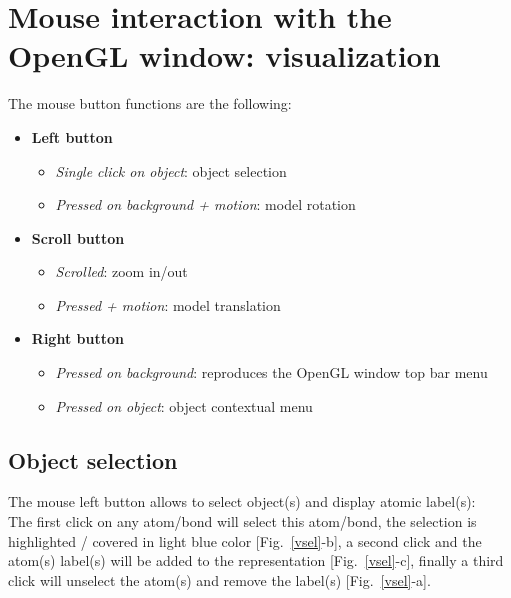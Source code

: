 \clearpage

\section{Mouse interaction with the OpenGL window: visualization}
\label{mviz}

The mouse button functions are the following:
\begin{itemize}
\item {\bf{Left button}}
\begin{itemize}
\item {\em{Single click on object}}: object selection
\item {\em{Pressed on background + motion}}: model rotation 
\end{itemize}
\item {\bf{Scroll button}}
\begin{itemize}
\item {\em{Scrolled}}: zoom in/out
\item {\em{Pressed + motion}}: model translation 
\end{itemize}
\item {\bf{Right button}}
\begin{itemize}
\item {\em{Pressed on background}}: reproduces the OpenGL window top bar menu
\item {\em{Pressed on object}}: object contextual menu
\end{itemize}
\end{itemize}

\subsection{Object selection}
\label{msel}
The mouse left button allows to select object(s) and display atomic label(s):\\
\oselfig
\laf The first click on any atom/bond will select this atom/bond, the selection is highlighted / covered in light blue color [Fig.~\ref{vsel}-b], 
a second click and the atom(s) label(s) will be added to the representation [Fig.~\ref{vsel}-c], finally a third click will unselect 
the atom(s) and remove the label(s) [Fig.~\ref{vsel}-a].


